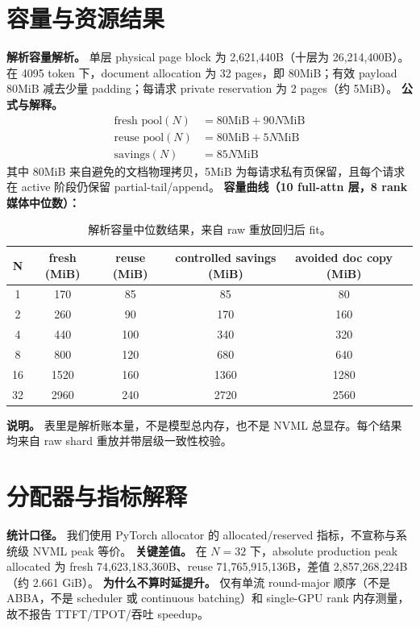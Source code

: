 \documentclass[11pt]{article}
\begin{document}
\section{容量与资源结果}
\textbf{解析容量解析。} 单层 physical page block 为 2,621,440B（十层为 26,214,400B）。在 4095 token 下，document allocation 为 32 pages，即 80MiB；有效 payload 80MiB 减去少量 padding；每请求 private reservation 为 2 pages（约 5MiB）。  
\textbf{公式与解释。}
\begin{align}
\text{fresh pool}(N) &= 80\mathrm{MiB} + 90N\mathrm{MiB}\\
\text{reuse pool}(N) &= 80\mathrm{MiB} + 5N\mathrm{MiB}\\
\text{savings}(N) &= 85N\mathrm{MiB}
\end{align}
其中 80MiB 来自避免的文档物理拷贝，5MiB 为每请求私有页保留，且每个请求在 active 阶段仍保留 partial-tail/append。  
\textbf{容量曲线（10 full-attn 层，8 rank 媒体中位数）：}
\begin{table}[h]
\centering
\begin{tabular}{cccccc}
\toprule
N & fresh (MiB) & reuse (MiB) & controlled savings (MiB) & avoided doc copy (MiB)\\
\midrule
1 & 170 & 85 & 85 & 80\\
2 & 260 & 90 & 170 & 160\\
4 & 440 & 100 & 340 & 320\\
8 & 800 & 120 & 680 & 640\\
16 & 1520 & 160 & 1360 & 1280\\
32 & 2960 & 240 & 2720 & 2560\\
\bottomrule
\end{tabular}
\caption{解析容量中位数结果，来自 raw 重放回归后 fit。}
\end{table}
\textbf{说明。} 表里是解析账本量，不是模型总内存，也不是 NVML 总显存。每个结果均来自 raw shard 重放并带层级一致性校验。

\section{分配器与指标解释}
\textbf{统计口径。} 我们使用 PyTorch allocator 的 allocated/reserved 指标，不宣称与系统级 NVML peak 等价。  
\textbf{关键差值。} 在 $N=32$ 下，absolute production peak allocated 为 fresh 74,623,183,360B、reuse 71,765,915,136B，差值 2,857,268,224B（约 2.661 GiB）。  
\textbf{为什么不算时延提升。} 仅有单流 round-major 顺序（不是 ABBA，不是 scheduler 或 continuous batching）和 single-GPU rank 内存测量，故不报告 TTFT/TPOT/吞吐 speedup。
\end{document}
